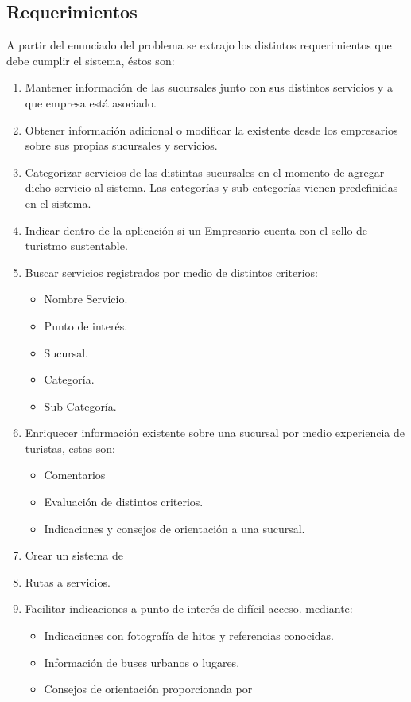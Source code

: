 \documentclass[12pt]{article}
\begin{document}
\subsection{Requerimientos}
A partir del enunciado del problema se extrajo los distintos requerimientos que debe cumplir el sistema, éstos son:
\begin{enumerate}
\item Mantener información de las sucursales junto con sus distintos servicios y a que empresa está asociado.
\item Obtener información adicional o modificar la existente desde los empresarios sobre sus propias sucursales y servicios.
\item Categorizar servicios de las distintas sucursales en el momento de agregar dicho servicio al sistema. Las categorías y sub-categorías vienen predefinidas en el sistema.
\item Indicar dentro de la aplicación si un Empresario cuenta con el sello de turistmo sustentable.
\item Buscar servicios registrados por medio de distintos criterios:
	\begin{itemize}
		\item Nombre Servicio.
		\item Punto de interés.
		\item Sucursal.
		\item Categoría.
		\item Sub-Categoría.
	\end{itemize}
\item Enriquecer información existente sobre una sucursal por medio experiencia de turistas, estas son:
	\begin{itemize}
		\item Comentarios
		\item Evaluación de distintos criterios.
		\item Indicaciones y consejos de orientación a una sucursal.
	\end{itemize}
\item Crear un sistema de 
\item Rutas a servicios.
\newpage
\item Facilitar indicaciones a punto de interés de difícil acceso. mediante:
	\begin{itemize}
		\item Indicaciones con fotografía de hitos y referencias conocidas.
		\item Información de buses urbanos o lugares.
		\item Consejos de orientación proporcionada por

\end{itemize}
\end{enumerate}
\end{document}
